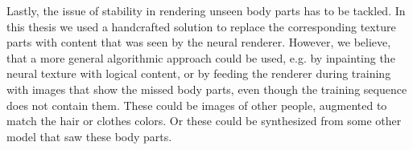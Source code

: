 Lastly, the issue of stability in rendering unseen body parts has to be tackled. In this thesis we used a handcrafted solution to replace the corresponding texture parts with content that was seen by the neural renderer. However, we believe, that a more general algorithmic approach could be used, e.g. by inpainting the neural texture with logical content, or by feeding the renderer during training with images that show the missed body parts, even though the training sequence does not contain them. These could be images of other people, augmented to match the hair or clothes colors. Or these could be synthesized from some other model that saw these body parts.

